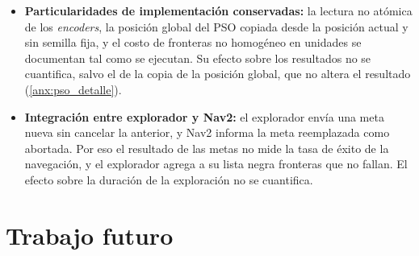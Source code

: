 \begin{itemize}
\item \textbf{Particularidades de implementación conservadas:} la lectura no atómica de los \textit{encoders}, la posición global del PSO copiada desde la posición actual y sin semilla fija, y el costo de fronteras no homogéneo en unidades se documentan tal como se ejecutan. Su efecto sobre los resultados no se cuantifica, salvo el de la copia de la posición global, que no altera el resultado (\ref{anx:pso_detalle}).
\item \textbf{Integración entre explorador y Nav2:} el explorador envía una meta nueva sin cancelar la anterior, y Nav2 informa la meta reemplazada como abortada. Por eso el resultado de las metas no mide la tasa de éxito de la navegación, y el explorador agrega a su lista negra fronteras que no fallan. El efecto sobre la duración de la exploración no se cuantifica.
\end{itemize}

\section*{Trabajo futuro}
{}


